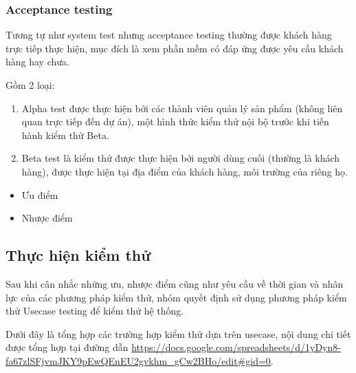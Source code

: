 \subsubsection{Acceptance testing}
Tương tự như system test nhưng acceptance testing thường được khách hàng trực tiếp thực hiện, mục đích là xem phần mềm có đáp ứng được yêu cầu khách hàng hay chưa.

Gồm 2 loại:
\begin{enumerate}
    \item Alpha test được thực hiện bởi các thành viên quản lý sản phẩm (không liên quan trực tiếp đến dự án), một hình thức kiểm thử nội bộ trước khi tiến hành kiểm thử Beta.
    \item Beta test là kiểm thử được thực hiện bởi người dùng cuối (thường là khách hàng), được thực hiện tại địa điểm của khách hàng, môi trường của riêng họ.
\end{enumerate}

\begin{itemize}
    \item Ưu điểm
    \item Nhược điểm
\end{itemize}

\subsection{Thực hiện kiểm thử}

Sau khi cân nhắc những ưu, nhược điểm cũng như yêu cầu về thời gian và nhân lực của các phương pháp kiểm thử, nhóm quyết định sử dụng phương pháp kiểm thử Usecase testing để kiểm thử hệ thống.

Dưới đây là tổng hợp các trường hợp kiểm thử dựa trên usecase, nội dung chi tiết được tổng hợp tại đường dẫn \url{https://docs.google.com/spreadsheets/d/1yDyn8-fa67zlSFjvmJKY9pEwQEnEU2gvkhm_gCw2BHo/edit#gid=0}.

